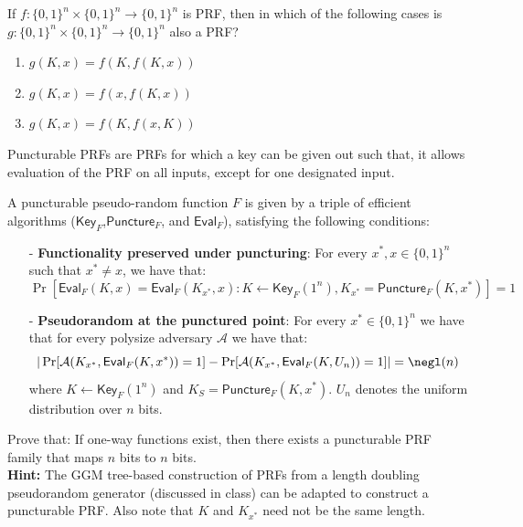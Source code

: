 \begin{exercise}
    If $f: \{0,1\}^{n}\times \{0,1\}^n\rightarrow \{0,1\}^n$  is PRF, then in which of the following cases is $g: \{0,1\}^{n}\times \{0,1\}^n\rightarrow \{0,1\}^n$ also a PRF? \begin{enumerate} \item $g(K,x) = f(K,f(K,x))$ \item $g(K,x) = f(x,f(K,x))$ \item $g(K,x) = f(K,f(x,K))$
    \end{enumerate}
\end{exercise}

\begin{exercise} Puncturable PRFs are PRFs for which a key can be given out such that, it allows evaluation of the PRF on all inputs, except for one designated input.

    \newcommand{\A}{\mathcal{A}}
    \newcommand{\F}{F}
    \newcommand{\KeyF}{\mathsf{Key}_{\F}}
    \newcommand{\PunctureF}{\mathsf{Puncture}_{\F}}
    \newcommand{\EvalF}{\mathsf{Eval}_{\F}}


    A puncturable pseudo-random function $\F$ is given by a triple of efficient algorithms ($\KeyF$,$\PunctureF$, and $\EvalF$), satisfying the following conditions:
    \begin{itemize}
        \item[-] \textbf{Functionality preserved under puncturing}: For every $x^*, x \in \{0,1\}^{n}$ such that $x^* \neq x$, we have that:
              $$\Pr[\EvalF(K,x) = \EvalF(K_{x^*},x) : K \gets \KeyF(1^n), K_{x^*} = \PunctureF(K,x^*)] = 1$$
        \item[-] \textbf{Pseudorandom at the punctured point}: For every $x^*\in \{0,1\}^n$ we have that for every polysize adversary $\A$ we have that:
              $$|\Pr[\A(K_{x^*}, \EvalF(K,x^*)) = 1] - \Pr[\A(K_{x^*}, \EvalF(K,U_n)) = 1]|= \negl(n)$$
              where $K \gets \KeyF(1^n)$ and $K_S = \PunctureF(K,x^*)$. $U_n$ denotes the uniform distribution over $n$ bits.
    \end{itemize}

    Prove that: If one-way functions exist, then there exists a puncturable PRF family that maps $n$ bits to $n$ bits. \\
    \textbf{Hint:} The GGM tree-based construction of PRFs from a length doubling pseudorandom generator (discussed in class) can be adapted to construct a puncturable PRF. Also note that $K$ and $K_{x^*}$ need not be the same length.
\end{exercise}
